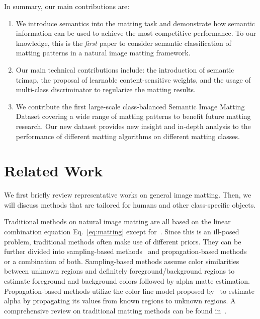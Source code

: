 \documentclass[10pt,twocolumn,letterpaper]{article}
\begin{document}
In summary, our main contributions are:
\begin{enumerate}
\vspace{-0.05in}
    \item We introduce semantics into the matting task and demonstrate how semantic information can be used to achieve the most competitive performance. To our knowledge, this is the {\em first} paper to consider semantic classification of matting patterns in a natural image matting framework.
    \vspace{-0.05in}
    \item Our main technical contributions include: the introduction of semantic trimap, the proposal of learnable content-sensitive weights, and the usage of multi-class discriminator to regularize the matting results.
    \vspace{-0.05in}
    \item We contribute the first large-scale class-balanced Semantic Image Matting Dataset covering a wide range of matting patterns to benefit future matting research. Our new dataset provides  new insight and  in-depth analysis to the performance of different matting algorithms on different matting classes.
\end{enumerate}

\section{Related Work}
We first briefly review representative works on general image matting. Then, we will discuss methods that are tailored for humans and other class-specific objects.

\vspace{4pt}
 Traditional methods on natural image matting are all based on the linear combination equation Eq.~\ref{eq:matting} except for~\cite{tai2007soft,kong2009transductive}. Since this is an ill-posed problem, traditional methods often make use of different priors. They can be further divided into sampling-based methods~\cite{Chuang-2001-CVPR-bayesianmatting,Feng-2016-ECCV-clustersampling,GastalOliveira-2010-CGF-SharedMatting,He-2011-cvpr-globalsampling,Ruzon-2000-cvpr-alphaestimation} and propagation-based methods~\cite{Aksoy-2017-cvpr-ifm,Aksoy-2018-tg-sss,bai-iccv-geodesicframework,Chen-2012-PAMI-knnmatting,grady2005random,levin2008closed,levin2008spectral} or a combination of both. Sampling-based methods assume color similarities between unknown regions and definitely foreground/background regions to estimate foreground and background colors followed by alpha matte estimation. Propagation-based methods utilize the color line model proposed by~\cite{levin2008closed} to estimate alpha by propagating its values from known regions to unknown regions. A comprehensive review on traditional matting methods can be found in~\cite{wang2008mattingsurvey,Cho-2016-mattingusingdeepcnn}.
\end{document}
